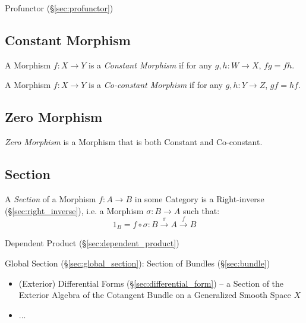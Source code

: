 Profunctor (\S\ref{sec:profunctor})



\subsection{Constant Morphism}\label{sec:constant_morphism}

A Morphism $f : X \rightarrow Y$ is a \emph{Constant Morphism} if for
any $g, h : W \rightarrow X$, $fg = fh$.

A Morphism $f : X \rightarrow Y$ is a \emph{Co-constant Morphism} if
for any $g, h : Y \rightarrow Z$, $gf = hf$.



\subsection{Zero Morphism}\label{sec:zero_morphism}

\emph{Zero Morphism} is a Morphism that is both Constant and
Co-constant.



\subsection{Section}\label{sec:section}

A \emph{Section} of a Morphism $f : A \rightarrow B$ in some Category is a
Right-inverse (\S\ref{sec:right_inverse}), i.e. a Morphism $\sigma : B
\rightarrow A$ such that:
\[
  1_B = f \circ \sigma : B \xrightarrow{\sigma} A \xrightarrow{f} B
\]

Dependent Product (\S\ref{sec:dependent_product})

Global Section (\S\ref{sec:global_section}): Section of Bundles
(\S\ref{sec:bundle})

\begin{itemize}
  \item (Exterior) Differential Forms (\S\ref{sec:differential_form}) -- a
    Section of the Exterior Algebra of the Cotangent Bundle on a Generalized
    Smooth Space $X$
  \item ...
\end{itemize}




